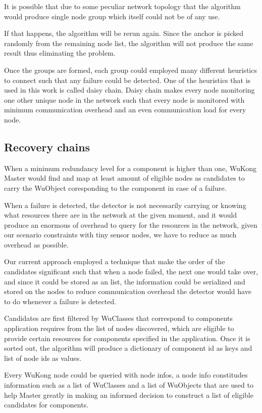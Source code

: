 It is possible that due to some peculiar network topology that the
algorithm would produce single node group which itself could not be of any use.

If that happens, the algorithm will be rerun again. Since the anchor is picked
randomly from the remaining node list, the algorithm will not produce the same
result thus eliminating the problem.

Once the groups are formed, each group could employed many different heuristics
to connect such that any failure could be detected. One of the heuristics that
is used in this work is called daisy chain. Daisy chain makes every node
monitoring one other unique node in the network such that every node is
monitored with minimum communication overhead and an even communication load
for every node.

\subsection{Recovery chains}

When a minimum redundancy level for a component is
higher than one, WuKong Master would find and map at least amount of eligible
nodes as candidates to carry the WuObject coresponding to the component in case of
a failure.

When a failure is detected, the detector is not necessarily carrying or knowing
what resources there are in the network at the given moment, and it would
produce an enormous of overhead to query for the resources in the network,
given our scenario constraints with tiny sensor nodes, we have to reduce as
much overhead as possible.

Our current approach employed a technique that make the order of the candidates
significant such that when a node failed, the next one would take over, and
since it could be stored as an list, the information could be serialized and
stored on the nodes to reduce communication overhead the detector would have to
do whenever a failure is detected.

Candidates are first filtered by WuClasses that correspond to components 
application requires from the list of nodes discovered, which
are eligible to provide certain resources for components specified in the
application. Once it is sorted out, the algorithm will produce a dictionary of
component id as keys and list of node ids as values.

Every WuKong node could be queried with node infos, a node info
constitudes information such as a list of WuClasses and a list of WuObjects
that are used to help Master greatly in making an informed decision to
construct a list of eligible candidates for components.

